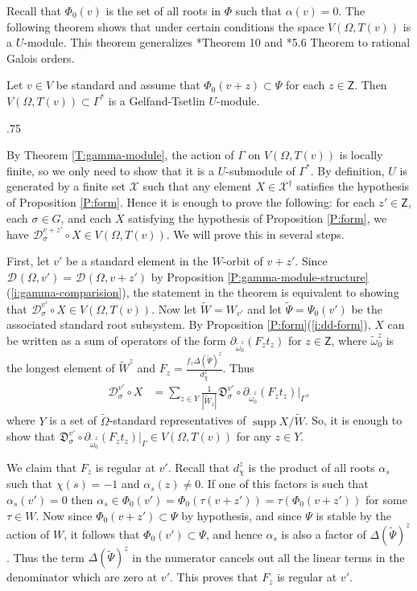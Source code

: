 \documentclass[11pt,fleqn]{amsart}
\makeatletter
\renewcommand\proofname{Proof}
\renewenvironment{proof}[1][\textit{\proofname}]{\par
 \pushQED{\qed}%
 \normalfont \topsep.75\paraskip\relax
 \trivlist
 \item[\hskip\labelsep
 \itshape
 #1\@addpunct{.}]\ignorespaces
}{%
 \popQED\endtrivlist\@endpefalse
}
\newcounter{para}[section]
\newcommand\D[3]{{}^{#1} \mathfrak D_{#2}^{#3}}
\newcommand\DD[3]{{}^{#1} \mathcal D_{#2}^{#3}}
\newcommand\Z{\mathsf Z}
\DeclareMathOperator\supp{supp}
\makeatother
\begin{document}
Recall that $\Phi_0(v)$ is the set of all roots in $\Phi$ such that $\alpha(v)
= 0$. The following theorem shows that under certain conditions the space 
$V(\Omega, T(v))$ is a $U$-module. This theorem generalizes 
\cite{EMV-orthogonal}*{Theorem 10} and 
\cite{RZ-singular-characters}*{5.6 Theorem} to rational Galois orders.
\begin{Theorem}
\label{T:module-structure}
Let $v \in V$ be standard and assume that $\Phi_0(v+z) \subset \Psi$ for each 
$z \in \Z$. Then $V(\Omega, T(v)) \subset \Gamma^*$ is a Gelfand-Tsetlin 
$U$-module.
\end{Theorem}
\begin{proof}
By Theorem \ref{T:gamma-module}, the action of $\Gamma$ on $V(\Omega, T(v))$ is
locally finite, so we only need to show that it is a $U$-submodule of 
$\Gamma^*$.
By definition, $U$ is generated by a finite set $\mathcal X$ such that 
any element $X \in \mathcal X^\dagger$ satisfies the hypothesis of Proposition 
\ref{P:form}. Hence it is enough to prove the following: for each $z' \in \Z$, 
each $\sigma \in G$, and each $X$ satisfying the hypothesis of Proposition 
\ref{P:form}, we have $\DD{}{\sigma}{v+z'} \circ X \in V(\Omega, T(v))$. We 
will prove this in several steps. 

First, let $v'$ be a standard element in the $W$-orbit of $v + z'$. Since 
$\DD{}{}{}(\Omega, v') = \DD{}{}{}(\Omega, v+ z')$ by Proposition 
\ref{P:gamma-module-structure}(\ref{i:gamma-comparision}),
the statement in the theorem is equivalent to showing that $\DD{}{\sigma}{v'} 
\circ X \in V(\Omega, T(v))$. Now let $\widetilde W = W_{v'}$ and let 
$\widetilde \Psi = \Psi_0(v')$ be 
the associated standard root subsystem. By Proposition 
\ref{P:form}(\ref{i:dd-form}), $X$ can be written as a sum of operators of the form 
$\partial_{\widetilde \omega_0^z}(F_z t_z)$ for $z \in \Z$, where $\widetilde 
\omega_0^z$ is the longest element of $\widetilde W^z$ and $F_z = \frac{f_z 
\Delta(\widetilde \Psi)^z}{d_\chi^z}$. Thus 
\begin{align*}
\DD{}{\sigma}{v'} \circ X
	&= \sum_{z \in Y} \frac{1}{|\widetilde W_z|}
		\D{}{\sigma}{v'} \circ \partial_{\widetilde \omega_0^{z}}(
			F_z t_z)|_\Gamma,
\end{align*}
where $Y$ is a set of $\widetilde \Omega$-standard representatives of $\supp X / 
\widetilde W$. So, it is enough to show that $\D{}{\sigma}{v'} \circ 
\partial_{\widetilde \omega_0^z}(F_z t_z)|_\Gamma \in V(\Omega, T(v))$ for any $z \in 
Y$.

We claim that $F_z$ is regular at $v'$. Recall that $d_\chi^z$ is the product
of all roots $\alpha_s$ such that $\chi(s) = -1$ and $\alpha_s(z) \neq 0$. If
one of this factors is such that $\alpha_s(v') = 0$ then $\alpha_s \in 
\Phi_0(v') = \Phi_0(\tau(v+z')) = \tau(\Phi_0(v+z'))$ for some $\tau \in W$. 
Now since $\Phi_0(v+z') \subset \Psi$ by hypothesis, and since $\Psi$ is stable
by the action of $W$, it follows that $\Phi_0(v') \subset \Psi$, and hence 
$\alpha_s$ is also a factor of $\Delta(\widetilde \Psi)^z$. Thus the term
$\Delta(\widetilde \Psi)^z$ in the numerator cancels out all the linear terms in
the denominator which are zero at $v'$. This proves that $F_z$ is regular at $v'$.


\end{proof}
\end{document}
